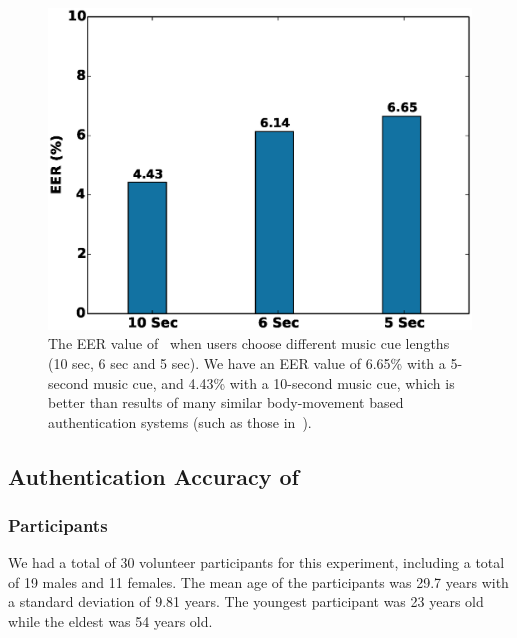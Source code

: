 


\begin{figure}[t]
\centering
\includegraphics [width=.85\columnwidth]{figure/exp2_eer_vary_length.eps}
\caption{The EER value of \systemname~when users choose different music cue lengths (10 sec, 6 sec and 5
sec). We have an EER value of 6.65\% with a 5-second music cue, and 4.43\% with a 10-second music cue, which is better than results of many similar body-movement based authentication systems (such as those in~\cite{gafurov2006biometric,rogers2015approach}).}
\label{fig:eer-length}
\vspace{-1mm}
\end{figure}




\subsection{Authentication Accuracy of \systemname}

\subsubsection{Participants}
We had a total of 30 volunteer participants for this experiment, including a total of 19 males and 11 females.
The mean age of the participants was 29.7 years with a standard deviation
of 9.81 years. The youngest participant was 23 years old while the eldest was
54 years old.

